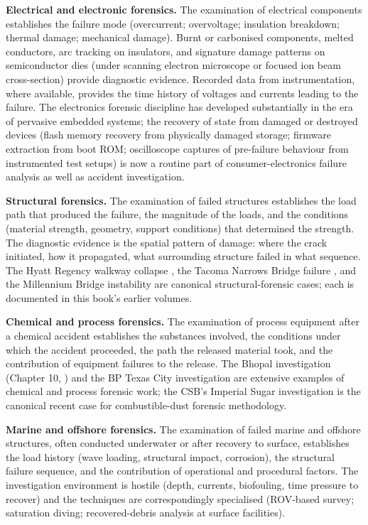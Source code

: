 \textbf{Electrical and electronic forensics.} The examination of electrical components establishes the failure mode (overcurrent; overvoltage; insulation breakdown; thermal damage; mechanical damage). Burnt or carbonised components, melted conductors, arc tracking on insulators, and signature damage patterns on semiconductor dies (under scanning electron microscope or focused ion beam cross-section) provide diagnostic evidence. Recorded data from instrumentation, where available, provides the time history of voltages and currents leading to the failure. The electronics forensic discipline has developed substantially in the era of pervasive embedded systems; the recovery of state from damaged or destroyed devices (flash memory recovery from physically damaged storage; firmware extraction from boot ROM; oscilloscope captures of pre-failure behaviour from instrumented test setups) is now a routine part of consumer-electronics failure analysis as well as accident investigation.

\textbf{Structural forensics.} The examination of failed structures establishes the load path that produced the failure, the magnitude of the loads, and the conditions (material strength, geometry, support conditions) that determined the strength. The diagnostic evidence is the spatial pattern of damage: where the crack initiated, how it propagated, what surrounding structure failed in what sequence. The Hyatt Regency walkway collapse \cite{acc:nbs-hyatt-1982}, the Tacoma Narrows Bridge failure \cite{acc:tacoma-narrows-1941}, and the Millennium Bridge instability \cite{acc:dallard-millennium-2001} are canonical structural-forensic cases; each is documented in this book's earlier volumes.

\textbf{Chemical and process forensics.} The examination of process equipment after a chemical accident establishes the substances involved, the conditions under which the accident proceeded, the path the released material took, and the contribution of equipment failures to the release. The Bhopal investigation (Chapter 10, \cite{acc:icmr-bhopal-2004}) and the BP Texas City investigation \cite{acc:csb-bp-texas-city-2007} are extensive examples of chemical and process forensic work; the CSB's Imperial Sugar investigation \cite{acc:csb-imperial-sugar-2009} is the canonical recent case for combustible-dust forensic methodology.

\textbf{Marine and offshore forensics.} The examination of failed marine and offshore structures, often conducted underwater or after recovery to surface, establishes the load history (wave loading, structural impact, corrosion), the structural failure sequence, and the contribution of operational and procedural factors. The investigation environment is hostile (depth, currents, biofouling, time pressure to recover) and the techniques are correspondingly specialised (ROV-based survey; saturation diving; recovered-debris analysis at surface facilities).

